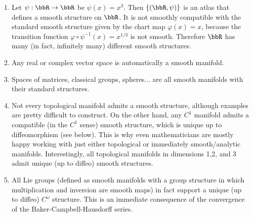 \begin{example}
\begin{enumerate}
    \item Let $\psi:\bbR \to\bbR $ be $\psi(x)=x^3$. Then $\{(\bbR ,\psi)\}$ is an atlas that defines a smooth structure on $\bbR $. It is not smoothly compatible with the standard smooth structure given by the chart map $\varphi(x)=x$, because the transition function $\varphi\circ \psi^{-1}(x)=x^{1/3}$ is not smooth. Therefore $\bbR $ has many (in fact, infinitely many) different smooth structures.
    \item Any real or complex vector space is automatically a smooth manifold.
    \item Spaces of matrices, classical groups, spheres... are all smooth manifolds with their standard structures.
    \item Not every topological manifold admits a smooth structure, although examples are pretty difficult to construct. On the other hand, any $C^1$ manifold admits a compatible (in the $C^1$ sense) smooth structure, which is unique up to diffeomorphism (see below). This is why even mathematicians are mostly happy working with just either topological or immediately smooth/analytic manifolds. Interestingly, all topological manifolds in dimensions 1,2, and 3 admit unique (up to diffeo) smooth structures.
    \item All Lie groups (defined as smooth manifolds with a group structure in which multiplication and inversion are smooth maps) in fact support a unique (up to diffeo) $C^\omega$ structure. This is an immediate consequence of the convergence of the Baker-Campbell-Hausdorff series.
\end{enumerate}
\end{example}

